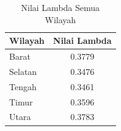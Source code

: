 \begin{table}[H]
    \centering
    \caption{Nilai Lambda Semua Wilayah}
    \label{table:nilai-lambda-semua-wilayah-arima}
    \begin{tabular}{l c}
        \toprule
        \textbf{Wilayah} & \textbf{Nilai Lambda} \\
        \midrule
        Barat   & 0.3779 \\
        Selatan & 0.3476 \\
        Tengah  & 0.3461 \\
        Timur   & 0.3596 \\
        Utara   & 0.3783 \\
        \bottomrule
    \end{tabular}
\end{table}